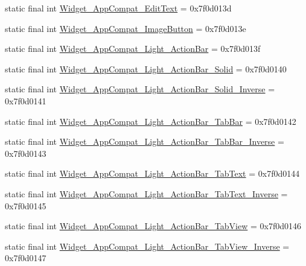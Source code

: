 \begin{DoxyCompactItemize}
\item 
static final int \mbox{\hyperlink{classandroid_1_1support_1_1design_1_1_r_1_1style_aa14bb02b82d02a1100e32ae372882cab}{Widget\+\_\+\+App\+Compat\+\_\+\+Edit\+Text}} = 0x7f0d013d
\item 
static final int \mbox{\hyperlink{classandroid_1_1support_1_1design_1_1_r_1_1style_a54f517f252b1f57ad368bffa0b53d903}{Widget\+\_\+\+App\+Compat\+\_\+\+Image\+Button}} = 0x7f0d013e
\item 
static final int \mbox{\hyperlink{classandroid_1_1support_1_1design_1_1_r_1_1style_a931e5804532cff8dfa368268461dff2d}{Widget\+\_\+\+App\+Compat\+\_\+\+Light\+\_\+\+Action\+Bar}} = 0x7f0d013f
\item 
static final int \mbox{\hyperlink{classandroid_1_1support_1_1design_1_1_r_1_1style_a839a83b5abd51f1a0511646f9e60061f}{Widget\+\_\+\+App\+Compat\+\_\+\+Light\+\_\+\+Action\+Bar\+\_\+\+Solid}} = 0x7f0d0140
\item 
static final int \mbox{\hyperlink{classandroid_1_1support_1_1design_1_1_r_1_1style_aa0b0c2ca37bdb2f84bf6177dfa44d787}{Widget\+\_\+\+App\+Compat\+\_\+\+Light\+\_\+\+Action\+Bar\+\_\+\+Solid\+\_\+\+Inverse}} = 0x7f0d0141
\item 
static final int \mbox{\hyperlink{classandroid_1_1support_1_1design_1_1_r_1_1style_abb13b7b02573cf138e9b71d0bfbe31c9}{Widget\+\_\+\+App\+Compat\+\_\+\+Light\+\_\+\+Action\+Bar\+\_\+\+Tab\+Bar}} = 0x7f0d0142
\item 
static final int \mbox{\hyperlink{classandroid_1_1support_1_1design_1_1_r_1_1style_a88d71d2ee7d784d399f6ecca8aa2e9be}{Widget\+\_\+\+App\+Compat\+\_\+\+Light\+\_\+\+Action\+Bar\+\_\+\+Tab\+Bar\+\_\+\+Inverse}} = 0x7f0d0143
\item 
static final int \mbox{\hyperlink{classandroid_1_1support_1_1design_1_1_r_1_1style_a4b115a3c2050ab4bf030e46c11eb60a0}{Widget\+\_\+\+App\+Compat\+\_\+\+Light\+\_\+\+Action\+Bar\+\_\+\+Tab\+Text}} = 0x7f0d0144
\item 
static final int \mbox{\hyperlink{classandroid_1_1support_1_1design_1_1_r_1_1style_a7ca113d19597f857720ec90315950010}{Widget\+\_\+\+App\+Compat\+\_\+\+Light\+\_\+\+Action\+Bar\+\_\+\+Tab\+Text\+\_\+\+Inverse}} = 0x7f0d0145
\item 
static final int \mbox{\hyperlink{classandroid_1_1support_1_1design_1_1_r_1_1style_a4c52b2eae6f6bf30c300ecd89d4d6f05}{Widget\+\_\+\+App\+Compat\+\_\+\+Light\+\_\+\+Action\+Bar\+\_\+\+Tab\+View}} = 0x7f0d0146
\item 
static final int \mbox{\hyperlink{classandroid_1_1support_1_1design_1_1_r_1_1style_a98e2bea27b6e8d254311f92404db5f46}{Widget\+\_\+\+App\+Compat\+\_\+\+Light\+\_\+\+Action\+Bar\+\_\+\+Tab\+View\+\_\+\+Inverse}} = 0x7f0d0147

\end{DoxyCompactItemize}
